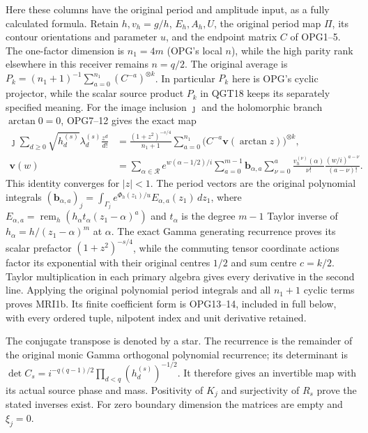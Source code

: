 \documentclass[11pt,a4paper]{article}
\begin{document}
Here these columns have the original period and amplitude input,
as a fully calculated formula. Retain $h,v_h=g/h$, $E_h,A_h,U$,
the original period map $\Pi$, its contour orientations and
parameter $u$, and the endpoint matrix $C$ of OPG1--5. The
one-factor dimension is $n_1=4m$ (OPG's local $n$), while the
high parity rank elsewhere in this receiver remains $n=q/2$.
The original average is
$P_k=(n_1+1)^{-1}\sum_{a=0}^{n_1}(C^{-a})^{\otimes k}$.
In particular $P_k$ here is OPG's cyclic projector, while the
scalar source product $P_k$ in QGT18 keeps its separately
specified meaning. For the image inclusion $\jmath$ and the
holomorphic branch $\arctan0=0$, OPG7--12 gives the exact map
\[
\begin{split}
 \jmath\sum_{d\ge0}\sqrt{h_d^{(s)}}\lambda_d^{(s)}\frac{z^d}{d!}
 &=\frac{(1+z^2)^{-s/4}}{n_1+1}
       \sum_{a=0}^{n_1}
          \bigl(C^{-a}\mathbf v(\arctan z)\bigr)^{\otimes k},\\
 \mathbf v(w)
 &=\sum_{\alpha\in\mathcal R}e^{w(\alpha-1/2)/i}
       \sum_{a=0}^{m-1}\mathbf b_{\alpha,a}
       \sum_{\nu=0}^{a}\frac{v_h^{(\nu)}(\alpha)}{\nu!}
                       \frac{(w/i)^{a-\nu}}{(a-\nu)!}.
\end{split}\tag{MRI1b}
\]
This identity converges for $|z|<1$. The period vectors are the
original polynomial integrals
$(\mathbf b_{\alpha,a})_j=\int_{\Gamma_j}
e^{\Phi_h(z_1)/u}E_{\alpha,a}(z_1)\,dz_1$, where
$E_{\alpha,a}=\operatorname{rem}_h(h_\alpha t_\alpha
(z_1-\alpha)^a)$ and $t_\alpha$ is the degree $m-1$ Taylor
inverse of $h_\alpha=h/(z_1-\alpha)^m$ at $\alpha$.
The exact Gamma generating recurrence proves its scalar
prefactor $(1+z^2)^{-s/4}$, while the commuting tensor coordinate
actions factor its exponential with their original centres
$1/2$ and sum centre $c=k/2$. Taylor multiplication in each
primary algebra gives every derivative in the second line.
Applying the original polynomial period integrals and all
$n_1+1$ cyclic terms proves MRI1b. Its finite coefficient form
is OPG13--14, included in full below, with every ordered tuple,
nilpotent index and unit derivative retained.

The conjugate transpose is denoted by a star. The recurrence is
the remainder of the original monic Gamma orthogonal polynomial
recurrence; its determinant is
$\det C_s=i^{-q(q-1)/2}\prod_{d<q}(h_d^{(s)})^{-1/2}$.
It therefore gives an invertible map with its actual source
phase and mass. Positivity of $K_j$ and surjectivity of $R_s$
prove the stated inverses exist. For zero boundary dimension
the matrices are empty and $\xi_j=0$.
\end{document}
